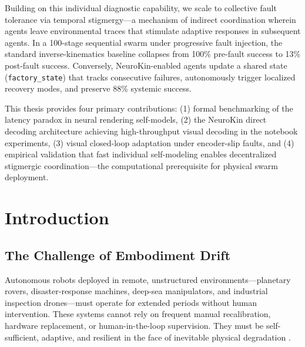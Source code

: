 \documentclass[12pt,a4paper,oneside]{report}
\begin{document}
Building on this individual diagnostic capability, we scale to collective fault tolerance via temporal stigmergy—a mechanism of indirect coordination wherein agents leave environmental traces that stimulate adaptive responses in subsequent agents. In a 100-stage sequential swarm under progressive fault injection, the standard inverse-kinematics baseline collapses from 100\% pre-fault success to 13\% post-fault success. Conversely, NeuroKin-enabled agents update a shared state (\texttt{factory\_state}) that tracks consecutive failures, autonomously trigger localized recovery modes, and preserve 88\% systemic success.

This thesis provides four primary contributions: (1) formal benchmarking of the latency paradox in neural rendering self-models, (2) the NeuroKin direct decoding architecture achieving high-throughput visual decoding in the notebook experiments, (3) visual closed-loop adaptation under encoder-slip faults, and (4) empirical validation that fast individual self-modeling enables decentralized stigmergic coordination—the computational prerequisite for physical swarm deployment.

\clearpage

\tableofcontents
\clearpage
\listoffigures
{}
\clearpage
\listoftables
{}
\clearpage


\chapter{Introduction}

\section{The Challenge of Embodiment Drift}

Autonomous robots deployed in remote, unstructured environments—planetary rovers, disaster-response machines, deep-sea manipulators, and industrial inspection drones—must operate for extended periods without human intervention. These systems cannot rely on frequent manual recalibration, hardware replacement, or human-in-the-loop supervision. They must be self-sufficient, adaptive, and resilient in the face of inevitable physical degradation \cite{bongard2006resilient, cully2015robots}.
\end{document}
